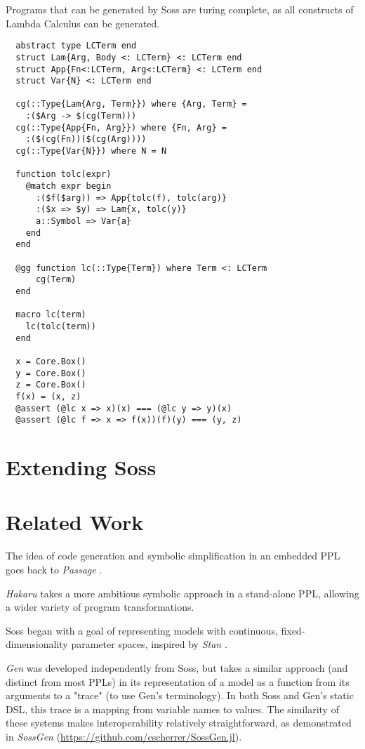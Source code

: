 \documentclass[anonymous=false, %
               format=acmsmall, %
               review=true, %
               screen=true, %
               nonacm=true]{acmart}
\begin{document}
Programs that can be generated by Soss are turing complete, as all constructs of Lambda Calculus can be generated.

\begin{verbatim}
  abstract type LCTerm end
  struct Lam{Arg, Body <: LCTerm} <: LCTerm end
  struct App{Fn<:LCTerm, Arg<:LCTerm} <: LCTerm end
  struct Var{N} <: LCTerm end
  
  cg(::Type{Lam{Arg, Term}}) where {Arg, Term} = 
    :($Arg -> $(cg(Term)))
  cg(::Type{App{Fn, Arg}}) where {Fn, Arg} = 
    :($(cg(Fn))($(cg(Arg))))
  cg(::Type{Var{N}}) where N = N

  function tolc(expr)
    @match expr begin
      :($f($arg)) => App{tolc(f), tolc(arg)}
      :($x => $y) => Lam{x, tolc(y)}
      a::Symbol => Var{a}
    end
  end
  
  @gg function lc(::Type{Term}) where Term <: LCTerm
      cg(Term)
  end
  
  macro lc(term)
    lc(tolc(term))
  end
  
  x = Core.Box()
  y = Core.Box()
  z = Core.Box()
  f(x) = (x, z)
  @assert (@lc x => x)(x) === (@lc y => y)(x)
  @assert (@lc f => x => f(x))(f)(y) === (y, z)
  \end{verbatim} 



\section{Extending Soss}

\section{Related Work}

The idea of code generation and symbolic simplification in an embedded PPL goes back to \emph{Passage} \cite{Scherrer2012}. 

\emph{Hakaru} \cite{narayanan2016probabilistic} takes a more ambitious symbolic approach in a stand-alone PPL, allowing a wider variety of program transformations. 

Soss began with a goal of representing models with continuous, fixed-dimensionality parameter spaces, inspired by \emph{Stan} \cite{stan:2017}.

\emph{Gen} \cite{Cusumano-Towner:2019} was developed independently from Soss, but takes a similar approach (and distinct from most PPLs) in its representation of a model as a function from its arguments to a "trace" (to use Gen's terminology). In both Soss and Gen's static DSL, this trace is a mapping from variable names to values. The similarity of these systems makes interoperability relatively straightforward, as demonstrated in \emph{SossGen} (\url{https://github.com/cscherrer/SossGen.jl}).
\end{document}
